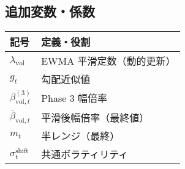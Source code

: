 \subsection*{追加変数・係数}
\begin{flushleft}
\begin{minipage}{0.88\textwidth}
\begin{tabularx}{\textwidth}{@{}lX@{}}
\toprule
記号 & 定義・役割 \\
\midrule
\(\lambda_{\text{vol}}\) & EWMA 平滑定数（動的更新） \\
\(g_t\) & 勾配近似値 \\
\(\beta_{\text{vol},t}^{(3)}\) & Phase 3 幅倍率 \\
\(\bar\beta_{\text{vol},t}\) & 平滑後幅倍率（最終値） \\
\(m_t\) & 半レンジ（最終） \\
\(\sigma_t^{\text{shift}}\) & 共通ボラティリティ \\
\bottomrule
\end{tabularx}
\end{minipage}
\end{flushleft}
